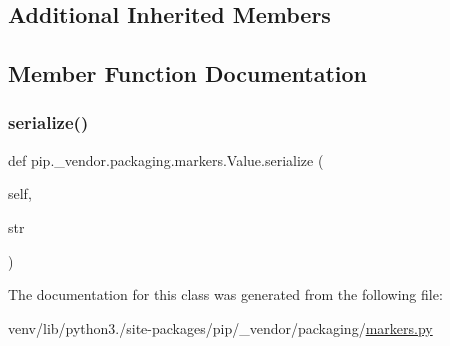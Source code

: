 \subsection*{Additional Inherited Members}


\subsection{Member Function Documentation}
\mbox{\label{classpip_1_1__vendor_1_1packaging_1_1markers_1_1Value_a8e09024b9ea4e55ecbb653c9d77a750b}} 
\subsubsection{\texorpdfstring{serialize()}{serialize()}}
{\footnotesize\ttfamily def pip.\+\_\+vendor.\+packaging.\+markers.\+Value.\+serialize (\begin{DoxyParamCaption}\item[{}]{self,  }\item[{}]{str }\end{DoxyParamCaption})}



The documentation for this class was generated from the following file\+:\begin{DoxyCompactItemize}
\item 
venv/lib/python3./site-\/packages/pip/\+\_\+vendor/packaging/\hyperlink{pip_2__vendor_2packaging_2markers_8py}{markers.\+py}\end{DoxyCompactItemize}
